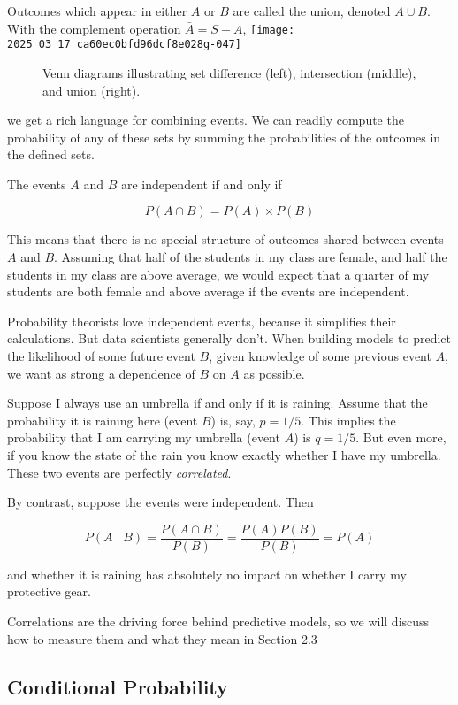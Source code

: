 \documentclass[10pt]{article}
\begin{document}
Outcomes which appear in either \(A\) or \(B\) are called the union, denoted \(A \cup B\). With the complement operation \(\bar{A} = S - A\), \texttt{[image: 2025\_03\_17\_ca60ec0bfd96dcf8e028g-047]}

\begin{figure}[h]
    \centering
   \caption{Venn diagrams illustrating set difference (left), intersection (middle), and union (right).}
\end{figure}

we get a rich language for combining events. We can readily compute the probability of any of these sets by summing the probabilities of the outcomes in the defined sets.

The events \(A\) and \(B\) are independent if and only if

\[ P(A \cap B) = P(A) \times P(B) \]

This means that there is no special structure of outcomes shared between events \(A\) and \(B\). Assuming that half of the students in my class are female, and half the students in my class are above average, we would expect that a quarter of my students are both female and above average if the events are independent.

Probability theorists love independent events, because it simplifies their calculations. But data scientists generally don’t. When building models to predict the likelihood of some future event \(B\), given knowledge of some previous event \(A\), we want as strong a dependence of \(B\) on \(A\) as possible.

Suppose I always use an umbrella if and only if it is raining. Assume that the probability it is raining here (event \(B\)) is, say, \(p=1/5\). This implies the probability that I am carrying my umbrella (event \(A\)) is \(q=1/5\). But even more, if you know the state of the rain you know exactly whether I have my umbrella. These two events are perfectly \textit{correlated}.

By contrast, suppose the events were independent. Then

\[ P(A \mid B)=\frac{P(A \cap B)}{P(B)}=\frac{P(A) P(B)}{P(B)}=P(A) \]

and whether it is raining has absolutely no impact on whether I carry my protective gear.

Correlations are the driving force behind predictive models, so we will discuss how to measure them and what they mean in Section 2.3

\subsection*{Conditional Probability}
\end{document}
